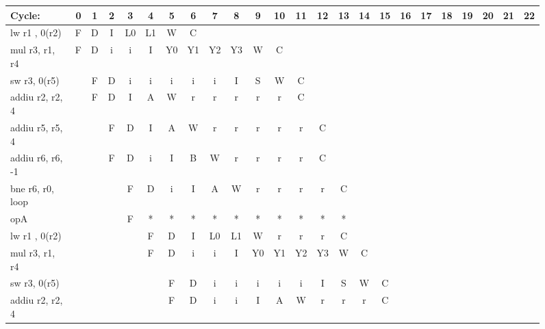 \documentclass[10pt]{article}
\begin{document}
\begin{figure}[H]
\centering
{\setlength{\tabcolsep}{2pt}
\begin{tabular}{|l|c|c|c|c|c|c|c|c|c|c|c|c|c|c!{\vrule width 1.5pt}c|c|c|c|c|c|c|c|c!{\vrule width 1.5pt}}
\hline
Cycle:            & 0  & 1  & 2  & 3  & 4  & 5  & 6  & 7  & 8  & 9  & 10 & 11 & 12 & 13 & 14 & 15 & 16 & 17 & 18 & 19 & 20 & 21 & 22 \\ \hline
lw r1 , 0(r2)     & F  & D  & I  & L0 & L1 & W  & C  &    &    &    &    &    &    &    &    &    &    &    &    &    &    &    &    \\ \hline
mul r3, r1, r4    & F  & D  & i  & i  & I  & Y0 & Y1 & Y2 & Y3 & W  & C  &    &    &    &    &    &    &    &    &    &    &    &    \\ \hline
sw r3, 0(r5)      &    & F  & D  & i  & i  & i  & i  & i  & I  & S  & W  & C  &    &    &    &    &    &    &    &    &    &    &    \\ \hline
addiu r2, r2, 4   &    & F  & D  & I  & A  & W  & r  & r  & r  & r  & r  & C  &    &    &    &    &    &    &    &    &    &    &    \\ \hline
addiu r5, r5, 4   &    &    & F  & D  & I  & A  & W  & r  & r  & r  & r  & r  & C  &    &    &    &    &    &    &    &    &    &    \\ \hline
addiu r6, r6, -1  &    &    & F  & D  & i  & I  & B  & W  & r  & r  & r  & r  & C  &    &    &    &    &    &    &    &    &    &    \\ \hline
bne r6, r0, loop  &    &    &    & F  & D  & i  & I  & A  & W  & r  & r  & r  & r  & C  &    &    &    &    &    &    &    &    &    \\ \hline
opA               &    &    &    & F  & *  & *  & *  & *  & *  & *  & *  & *  & *  & *  &    &    &    &    &    &    &    &    &    \\ \hline
lw r1 , 0(r2)     &    &    &    &    & F  & D  & I  & L0 & L1 & W  & r  & r  & r  & C  &    &    &    &    &    &    &    &    &    \\ \hline
mul r3, r1, r4    &    &    &    &    & F  & D  & i  & i  & I  & Y0 & Y1 & Y2 & Y3 & W  & C  &    &    &    &    &    &    &    &    \\ \hline
sw r3, 0(r5)      &    &    &    &    &    & F  & D  & i  & i  & i  & i  & i  & I  & S  & W  & C  &    &    &    &    &    &    &    \\ \hline
addiu r2, r2, 4   &    &    &    &    &    & F  & D  & i  & i  & I  & A  & W  & r  & r  & r  & C  &    &    &    &    &    &    &    \\ \hline

\end{tabular}}
\end{figure}
\end{document}
